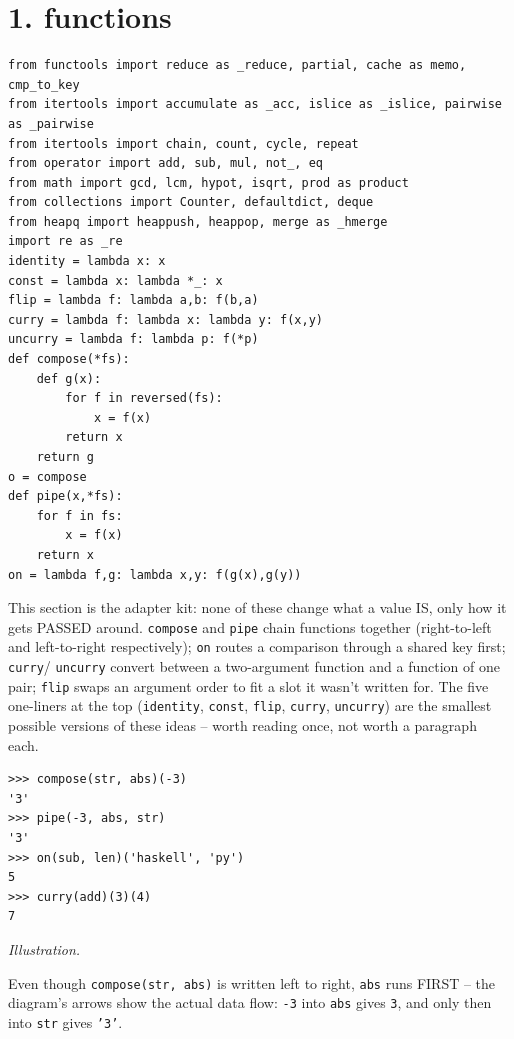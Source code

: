 \documentclass[10pt,letterpaper]{book}
\begin{document}
\section*{1. functions}
\begin{lstlisting}[style=code]
from functools import reduce as _reduce, partial, cache as memo, cmp_to_key
from itertools import accumulate as _acc, islice as _islice, pairwise as _pairwise
from itertools import chain, count, cycle, repeat
from operator import add, sub, mul, not_, eq
from math import gcd, lcm, hypot, isqrt, prod as product
from collections import Counter, defaultdict, deque
from heapq import heappush, heappop, merge as _hmerge
import re as _re
identity = lambda x: x
const = lambda x: lambda *_: x
flip = lambda f: lambda a,b: f(b,a)
curry = lambda f: lambda x: lambda y: f(x,y)
uncurry = lambda f: lambda p: f(*p)
def compose(*fs):
    def g(x):
        for f in reversed(fs):
            x = f(x)
        return x
    return g
o = compose
def pipe(x,*fs):
    for f in fs:
        x = f(x)
    return x
on = lambda f,g: lambda x,y: f(g(x),g(y))
\end{lstlisting}

This section is the adapter kit: none of these change what a value IS, only how it gets PASSED
around. \texttt{compose} and \texttt{pipe} chain functions together (right-to-left and left-to-right
respectively); \texttt{on} routes a comparison through a shared key first; \texttt{curry}/
\texttt{uncurry} convert between a two-argument function and a function of one pair; \texttt{flip}
swaps an argument order to fit a slot it wasn't written for. The five one-liners at the top
(\texttt{identity}, \texttt{const}, \texttt{flip}, \texttt{curry}, \texttt{uncurry}) are the smallest
possible versions of these ideas -- worth reading once, not worth a paragraph each.
\begin{lstlisting}[style=ex]
>>> compose(str, abs)(-3)
'3'
>>> pipe(-3, abs, str)
'3'
>>> on(sub, len)('haskell', 'py')
5
>>> curry(add)(3)(4)
7
\end{lstlisting}
\noindent\textit{Illustration.}
\begin{center}
\end{center}
Even though \texttt{compose(str, abs)} is written left to right, \texttt{abs} runs FIRST -- the
diagram's arrows show the actual data flow: \texttt{-3} into \texttt{abs} gives \texttt{3}, and only
then into \texttt{str} gives \texttt{'3'}.
\end{document}
